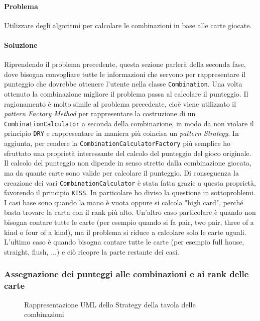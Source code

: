 \documentclass[a4paper,12pt]{report}
\begin{document}
 \paragraph{Problema}
 Utilizzare degli algoritmi per calcolare le combinazioni in base alle carte giocate.
 \paragraph{Soluzione}
 Riprendendo il problema precedente, questa sezione parlerà della seconda fase,
 dove bisogna convogliare tutte le informazioni che servono per rappresentare il
 punteggio che dovrebbe ottenere l’utente nella classe \texttt{Combination}.
Una volta ottenuto la combinazione migliore il problema passa al calcolare il
punteggio. Il ragionamento è molto simile al problema precedente, cioè viene utilizzato il \textit{pattern Factory Method}
per rappresentare la costruzione di un \texttt{CombinationCalculator} a seconda della
combinazione, in modo da non violare il principio \texttt{DRY} e rappresentare in maniera
più coincisa un \textit{pattern Strategy}. In aggiunta, per rendere la \texttt{CombinationCalculatorFactory}
più semplice ho sfruttato una proprietà interessante del calcolo del punteggio
del gioco originale. Il calcolo del punteggio non dipende
in senso stretto dalla combinazione giocata, ma da quante carte sono
valide per calcolare il punteggio. Di conseguenza la creazione
dei vari \texttt{CombinationCalculator} è stata fatta grazie a questa proprietà, favorendo il principio \texttt{KISS}.
In particolare ho diviso la questione in sottoproblemi. I casi base sono quando la mano
è vuota oppure si calcola "high card", perché basta trovare la carta con il rank più alto.
Un'altro caso particolare è quando non bisogna contare tutte le carte (per esempio quando si fa pair, two pair,
three of a kind o four of a kind), ma il problema si riduce a calcolare solo le carte uguali.
L'ultimo caso è quando bisogna contare tutte le carte (per esempio full house, straight, flush, ...)
e ciò ricopre la parte restante dei casi.

\subsubsection*{Assegnazione dei punteggi alle combinazioni e ai rank delle carte}
\begin{figure}[H]
	\centering{}
	
	\caption{Rappresentazione UML dello Strategy della tavola delle combinazioni}
	\label{img:tablecom}
\end{figure}
\end{document}
